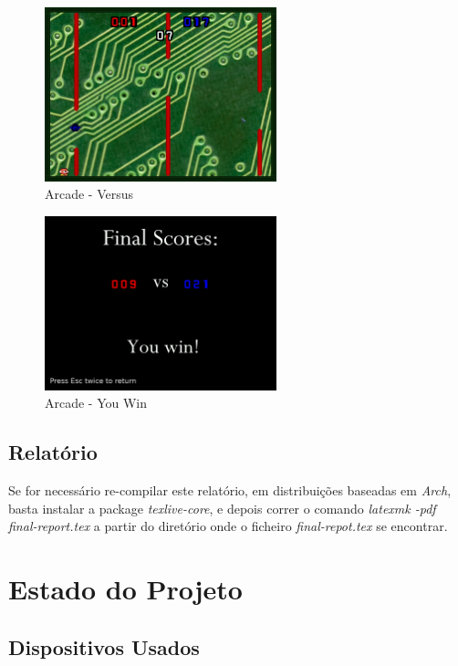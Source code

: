 \documentclass{report}
\begin{document}
\begin{figure}[H]
	\centering
	\includegraphics[width=0.6\textwidth]{arcade_versus}
	\caption{Arcade - Versus}
	\label{fig:arcade_versus}
\end{figure}


\begin{figure}[H]
	\centering
	\includegraphics[width=0.6\textwidth]{arcade_you_win}
	\caption{Arcade - You Win}
	\label{fig:arcade_you_win}
\end{figure}

\section{Relatório}

Se for necessário re-compilar este relatório, em distribuições baseadas em \textit{Arch}, basta instalar a package \textit{texlive-core}, e depois correr o comando \textit{latexmk -pdf final-report.tex} a partir do diretório onde o ficheiro \textit{final-repot.tex} se encontrar.

\chapter{Estado do Projeto}

\section{Dispositivos Usados}
\end{document}

